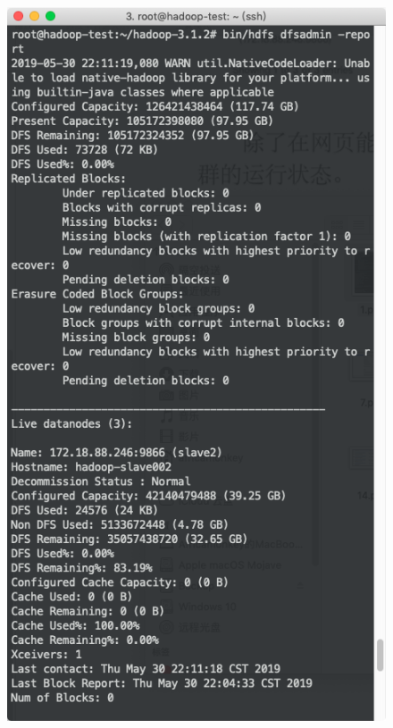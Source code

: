 \documentclass{article}
\begin{document}
\begin{figure}[!ht]
\centering
\includegraphics[scale=0.38]{image/1.png}

\end{figure}
\end{document}
